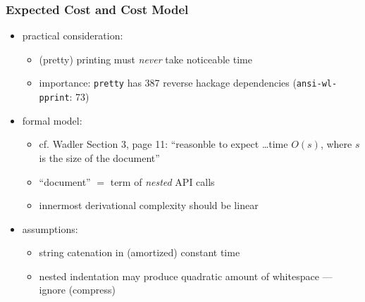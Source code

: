 \begin{frame}[fragile]
\frametitle{Expected Cost and Cost Model}

  \begin{itemize}%
\item
practical consideration: 
  \begin{itemize}
  \item (pretty) printing must \emph{never} take noticeable time
  \item importance: \texttt{pretty} has  387 reverse hackage dependencies (\texttt{ansi-wl-pprint}: 73)
  \end{itemize}
\item formal model:
\begin{itemize}
\item cf. Wadler Section 3, page 11:
  ``reasonble to expect \dots time $O(s)$,
  where $s$ is the size of the document''
  \item ``document'' $=$ term of \emph{nested} API calls
\item innermost derivational complexity  
  should be linear
\end{itemize}
\item assumptions:
  \begin{itemize}
  \item string catenation in (amortized) constant time
  \item nested indentation may produce
    quadratic amount of whitespace --- ignore (compress)
  \end{itemize}
\end{itemize}
\end{frame}
